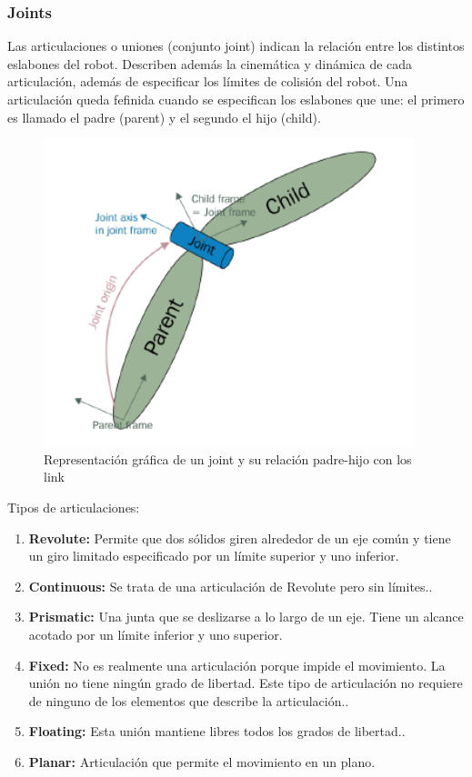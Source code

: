                                 \newpage

        
        \subsubsection{Joints}
        
        Las articulaciones o uniones (conjunto joint) indican la relación entre los distintos eslabones del robot. Describen además la cinemática y dinámica de cada articulación, además de especificar los límites de colisión del robot. Una articulación queda fefinida cuando se especifican los eslabones que une: el primero es llamado el padre (parent) y el segundo el hijo (child).
        
        \begin{figure}[htb]
            \centering
            \includegraphics[width=0.65\linewidth]{Main/Chapter3/Images3/3-8/representacion-de-una-articulacion-en-URDF.png}
            \caption{Representación gráfica de un joint y su relación padre-hijo con los link \cite{urdftutorials}}
            \label{f:Cap3-8_nose_nose}
        \end{figure} 
        
        Tipos de articulaciones:
        
        \begin{enumerate}
           \item \textbf{Revolute:} Permite que dos sólidos giren alrededor de un eje común y tiene un giro limitado especificado por un límite superior y uno inferior.
            \item \textbf{Continuous:} Se trata de una articulación de Revolute pero sin límites..
            \item \textbf{Prismatic:} Una junta que se deslizarse a lo largo de un eje. Tiene un alcance acotado por un límite inferior y uno superior.
            \item \textbf{Fixed:} No es realmente una articulación porque impide el movimiento. La unión no tiene ningún grado de libertad. Este tipo de articulación no requiere de ninguno de los elementos que describe la articulación..
            \item \textbf{Floating:} Esta unión mantiene libres todos los grados de libertad..
            \item \textbf{Planar:} Articulación que permite el movimiento en un plano.
        \end{enumerate}
        
